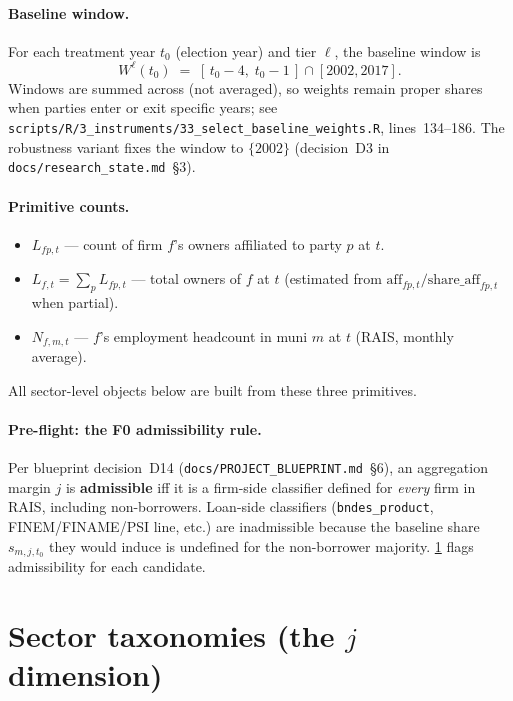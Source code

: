 \documentclass[12pt]{article}
\theoremstyle{definition}
\begin{document}
\paragraph{Baseline window.}
For each treatment year $t_0$ (election year) and tier $\ell$, the baseline window is
\[
  W^\ell(t_0) \;=\; [\,t_0-4,\; t_0-1\,] \cap [2002, 2017].
\]
Windows are summed across (not averaged), so weights remain proper shares when parties enter or exit specific years; see \texttt{scripts/R/3\_instruments/33\_select\_baseline\_weights.R}, lines~134--186. The robustness variant fixes the window to $\{2002\}$ (decision~D3 in \texttt{docs/research\_state.md}~\S3).

\paragraph{Primitive counts.}
\begin{itemize}[leftmargin=2em, itemsep=2pt]
\item $L_{fp,t}$ --- count of firm $f$'s owners affiliated to party $p$ at $t$.
\item $L_{f,t} = \sum_p L_{fp,t}$ --- total owners of $f$ at $t$ (estimated from $\mathrm{aff}_{fp,t}/\mathrm{share\_aff}_{fp,t}$ when partial).
\item $N_{f,m,t}$ --- $f$'s employment headcount in muni $m$ at $t$ (RAIS, monthly average).
\end{itemize}
All sector-level objects below are built from these three primitives.

\paragraph{Pre-flight: the F0 admissibility rule.}
Per blueprint decision~D14 (\texttt{docs/PROJECT\_BLUEPRINT.md}~\S6), an aggregation margin $j$ is \textbf{admissible} iff it is a firm-side classifier defined for \emph{every} firm in RAIS, including non-borrowers. Loan-side classifiers (\texttt{bndes\_product}, FINEM/FINAME/PSI line, etc.) are inadmissible because the baseline share $s_{m,j,t_0}$ they would induce is undefined for the non-borrower majority. \cref{sec:taxonomies} flags admissibility for each candidate.

\section{Sector taxonomies (the $j$ dimension)}
\label{sec:taxonomies}
\end{document}
